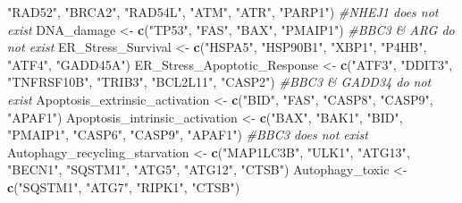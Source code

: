 \documentclass[]{article}
\newenvironment{Shaded}{\begin{snugshade}}{\end{snugshade}}
\newcommand{\CommentTok}[1]{\textcolor[rgb]{0.56,0.35,0.01}{\textit{#1}}}
\newcommand{\KeywordTok}[1]{\textcolor[rgb]{0.13,0.29,0.53}{\textbf{#1}}}
\newcommand{\NormalTok}[1]{#1}
\newcommand{\StringTok}[1]{\textcolor[rgb]{0.31,0.60,0.02}{#1}}
\begin{document}
\begin{Shaded}
\begin{Highlighting}[]
                \StringTok{"RAD52"}\NormalTok{, }\StringTok{"BRCA2"}\NormalTok{, }\StringTok{"RAD54L"}\NormalTok{, }\StringTok{"ATM"}\NormalTok{, }\StringTok{"ATR"}\NormalTok{, }\StringTok{"PARP1"}\NormalTok{)}
  \CommentTok{#NHEJ1 does not exist}
\NormalTok{DNA_damage <-}\StringTok{ }\KeywordTok{c}\NormalTok{(}\StringTok{"TP53"}\NormalTok{, }\StringTok{"FAS"}\NormalTok{, }\StringTok{"BAX"}\NormalTok{, }\StringTok{"PMAIP1"}\NormalTok{)}
  \CommentTok{#BBC3 & ARG do not exist}
\NormalTok{ER_Stress_Survival <-}\StringTok{ }\KeywordTok{c}\NormalTok{(}\StringTok{"HSPA5"}\NormalTok{, }\StringTok{"HSP90B1"}\NormalTok{, }\StringTok{"XBP1"}\NormalTok{, }\StringTok{"P4HB"}\NormalTok{, }\StringTok{"ATF4"}\NormalTok{, }\StringTok{"GADD45A"}\NormalTok{)}
\NormalTok{ER_Stress_Apoptotic_Response <-}\StringTok{ }\KeywordTok{c}\NormalTok{(}\StringTok{"ATF3"}\NormalTok{, }\StringTok{"DDIT3"}\NormalTok{, }\StringTok{"TNFRSF10B"}\NormalTok{, }\StringTok{"TRIB3"}\NormalTok{, }\StringTok{"BCL2L11"}\NormalTok{, }\StringTok{"CASP2"}\NormalTok{)}
  \CommentTok{#BBC3 & GADD34 do not exist}
\NormalTok{Apoptosis_extrinsic_activation <-}\StringTok{ }\KeywordTok{c}\NormalTok{(}\StringTok{"BID"}\NormalTok{, }\StringTok{"FAS"}\NormalTok{, }\StringTok{"CASP8"}\NormalTok{, }\StringTok{"CASP9"}\NormalTok{, }\StringTok{"APAF1"}\NormalTok{)}
\NormalTok{Apoptosis_intrinsic_activation <-}\StringTok{ }\KeywordTok{c}\NormalTok{(}\StringTok{"BAX"}\NormalTok{, }\StringTok{"BAK1"}\NormalTok{, }\StringTok{"BID"}\NormalTok{, }\StringTok{"PMAIP1"}\NormalTok{, }
                                    \StringTok{"CASP6"}\NormalTok{, }\StringTok{"CASP9"}\NormalTok{, }\StringTok{"APAF1"}\NormalTok{)}
  \CommentTok{#BBC3 does not exist}
\NormalTok{Autophagy_recycling_starvation <-}\StringTok{ }\KeywordTok{c}\NormalTok{(}\StringTok{"MAP1LC3B"}\NormalTok{, }\StringTok{"ULK1"}\NormalTok{, }\StringTok{"ATG13"}\NormalTok{, }\StringTok{"BECN1"}\NormalTok{, }
                                    \StringTok{"SQSTM1"}\NormalTok{, }\StringTok{"ATG5"}\NormalTok{, }\StringTok{"ATG12"}\NormalTok{, }\StringTok{"CTSB"}\NormalTok{)}
\NormalTok{Autophagy_toxic <-}\StringTok{ }\KeywordTok{c}\NormalTok{(}\StringTok{"SQSTM1"}\NormalTok{, }\StringTok{"ATG7"}\NormalTok{, }\StringTok{"RIPK1"}\NormalTok{, }\StringTok{"CTSB"}\NormalTok{)}


\end{Highlighting}
\end{Shaded}
\end{document}
